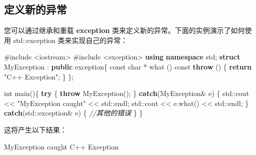 \documentclass[
]{article}
\newenvironment{Shaded}{}{}
\newcommand{\AttributeTok}[1]{\textcolor[rgb]{0.49,0.56,0.16}{#1}}
\newcommand{\BuiltInTok}[1]{#1}
\newcommand{\CommentTok}[1]{\textcolor[rgb]{0.38,0.63,0.69}{\textit{#1}}}
\newcommand{\ControlFlowTok}[1]{\textcolor[rgb]{0.00,0.44,0.13}{\textbf{#1}}}
\newcommand{\DataTypeTok}[1]{\textcolor[rgb]{0.56,0.13,0.00}{#1}}
\newcommand{\ImportTok}[1]{#1}
\newcommand{\KeywordTok}[1]{\textcolor[rgb]{0.00,0.44,0.13}{\textbf{#1}}}
\newcommand{\NormalTok}[1]{#1}
\newcommand{\OperatorTok}[1]{\textcolor[rgb]{0.40,0.40,0.40}{#1}}
\newcommand{\PreprocessorTok}[1]{\textcolor[rgb]{0.74,0.48,0.00}{#1}}
\newcommand{\StringTok}[1]{\textcolor[rgb]{0.25,0.44,0.63}{#1}}
\begin{document}
\hypertarget{ux5b9aux4e49ux65b0ux7684ux5f02ux5e38}{%
\subsection{定义新的异常}\label{ux5b9aux4e49ux65b0ux7684ux5f02ux5e38}}

您可以通过继承和重载 \textbf{exception}
类来定义新的异常。下面的实例演示了如何使用 std::exception
类来实现自己的异常：

\begin{Shaded}
\begin{Highlighting}[]
\PreprocessorTok{\#include }\ImportTok{\textless{}iostream\textgreater{}}
\PreprocessorTok{\#include }\ImportTok{\textless{}exception\textgreater{}}
\KeywordTok{using} \KeywordTok{namespace}\NormalTok{ std}\OperatorTok{;}
\KeywordTok{struct}\NormalTok{ MyException }\OperatorTok{:} \KeywordTok{public}\NormalTok{ exception}\OperatorTok{\{}
  \AttributeTok{const} \DataTypeTok{char} \OperatorTok{*}\NormalTok{ what }\OperatorTok{()} \AttributeTok{const} \ControlFlowTok{throw} \OperatorTok{()}
  \OperatorTok{\{}
    \ControlFlowTok{return} \StringTok{"C++ Exception"}\OperatorTok{;}
  \OperatorTok{\}}
\OperatorTok{\};}
 
\DataTypeTok{int}\NormalTok{ main}\OperatorTok{()\{}
  \ControlFlowTok{try}
  \OperatorTok{\{}
    \ControlFlowTok{throw}\NormalTok{ MyException}\OperatorTok{();}
  \OperatorTok{\}}
  \ControlFlowTok{catch}\OperatorTok{(}\NormalTok{MyException}\OperatorTok{\&}\NormalTok{ e}\OperatorTok{)}
  \OperatorTok{\{}
    \BuiltInTok{std::}\NormalTok{cout}\OperatorTok{ \textless{}\textless{}} \StringTok{"MyException caught"} \OperatorTok{\textless{}\textless{}} \BuiltInTok{std::}\NormalTok{endl}\OperatorTok{;}
    \BuiltInTok{std::}\NormalTok{cout}\OperatorTok{ \textless{}\textless{}}\NormalTok{ e}\OperatorTok{.}\NormalTok{what}\OperatorTok{()} \OperatorTok{\textless{}\textless{}} \BuiltInTok{std::}\NormalTok{endl}\OperatorTok{;}
  \OperatorTok{\}}
  \ControlFlowTok{catch}\OperatorTok{(}\BuiltInTok{std::}\NormalTok{exception}\OperatorTok{\&}\NormalTok{ e}\OperatorTok{)}
  \OperatorTok{\{}
    \CommentTok{//其他的错误}
  \OperatorTok{\}}
\OperatorTok{\}}
\end{Highlighting}
\end{Shaded}

这将产生以下结果：

\begin{Shaded}
\begin{Highlighting}[]
\NormalTok{MyException caught}
\NormalTok{C}\OperatorTok{++}\NormalTok{ Exception}
\end{Highlighting}
\end{Shaded}
\end{document}
